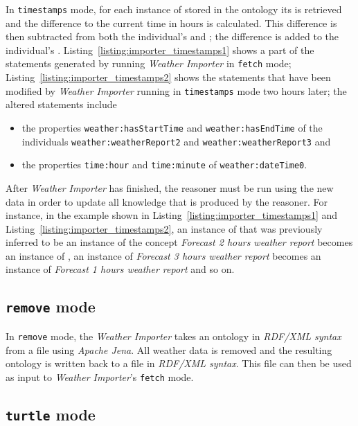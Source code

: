 In \texttt{timestamps} mode, for each instance of  stored in the ontology its  is retrieved and the difference to the current time in hours is calculated. This difference is then subtracted from both the individual's  and ; the difference is added to the individual's . Listing~\ref{listing:importer_timestamps1} shows a part of the statements generated by running \emph{Weather Importer} in \texttt{fetch} mode; Listing~\ref{listing:importer_timestamps2} shows the statements that have been modified by \emph{Weather Importer} running in \texttt{timestamps} mode two hours later; the altered statements include

\begin{itemize}
  \item the properties \texttt{weather:hasStartTime} and \texttt{weather:hasEndTime} of the individuals \texttt{weather:weatherReport2} and \texttt{weather:weatherReport3} and
  \item the properties \texttt{time:hour} and \texttt{time:minute} of \texttt{weather:dateTime0}.
\end{itemize}

After \emph{Weather Importer} has finished, the  reasoner must be run using the new data in order to update all knowledge that is produced by the reasoner. For instance, in the example shown in Listing~\ref{listing:importer_timestamps1} and Listing~\ref{listing:importer_timestamps2}, an instance of  that was previously inferred to be an instance of the concept \emph{Forecast 2 hours weather report} becomes an instance of , an instance of \emph{Forecast 3 hours weather report} becomes an instance of \emph{Forecast 1 hours weather report} and so on.

\subsection{\texttt{remove} mode}

In \texttt{remove} mode, the \emph{Weather Importer} takes an ontology in \emph{RDF/XML syntax} from a file using \emph{Apache Jena}. All weather data is removed and the resulting ontology is written back to a file in \emph{RDF/XML syntax}. This file can then be used as input to \emph{Weather Importer}'s \texttt{fetch} mode.

\subsection{\texttt{turtle} mode}
\label{subsec:importer_turtle}

